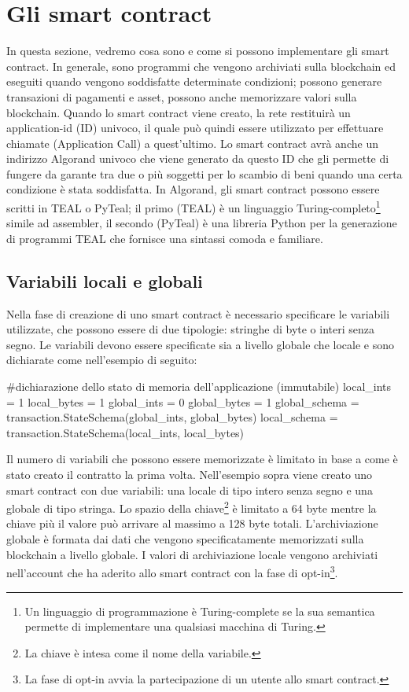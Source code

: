 \section{Gli smart contract}
In questa sezione, vedremo cosa sono e come si possono implementare gli smart contract. In generale, sono programmi che vengono archiviati sulla blockchain ed eseguiti quando vengono soddisfatte determinate condizioni; possono generare transazioni di pagamenti e asset, possono anche memorizzare valori sulla blockchain. Quando lo smart contract viene creato, la rete restituirà un application-id (ID) univoco, il quale può quindi essere utilizzato per effettuare chiamate (Application Call) a quest'ultimo. Lo smart contract avrà anche un indirizzo Algorand univoco che viene generato da questo ID che gli permette di fungere da garante tra due o più soggetti per lo scambio di beni quando una certa condizione è stata soddisfatta. In Algorand, gli smart contract possono essere scritti in TEAL o PyTeal; il primo (TEAL) è un linguaggio Turing-completo\footnote{Un linguaggio di programmazione è Turing-complete se la sua semantica permette di implementare una qualsiasi macchina di Turing.} simile ad assembler, il secondo (PyTeal) è una libreria Python per la generazione di programmi TEAL che fornisce una sintassi comoda e familiare.

\subsection{Variabili locali e globali}
Nella fase di creazione di uno smart contract è necessario specificare le variabili utilizzate, che possono essere di due tipologie: stringhe di byte o interi senza segno. Le variabili devono essere specificate sia a livello globale che locale e sono dichiarate come nell'esempio di seguito:

\begin{pythoncode}
#dichiarazione dello stato di memoria dell'applicazione (immutabile)
local_ints = 1
local_bytes = 1
global_ints = 0
global_bytes = 1
global_schema = transaction.StateSchema(global_ints, global_bytes)
local_schema = transaction.StateSchema(local_ints, local_bytes)
\end{pythoncode}

Il numero di variabili che possono essere memorizzate è limitato in base a come è stato creato il contratto la prima volta. Nell'esempio sopra viene creato uno smart contract con due variabili: una locale di tipo intero senza segno e una globale di tipo stringa. Lo spazio della chiave\footnote{La chiave è intesa come il nome della variabile.} è limitato a 64 byte mentre la chiave più il valore può arrivare al massimo a 128 byte totali. L’archiviazione globale è formata dai dati che vengono specificatamente memorizzati sulla blockchain a livello globale. I valori di archiviazione locale vengono archiviati nell'account che ha aderito allo smart contract con la fase di opt-in\footnote{La fase di opt-in avvia la partecipazione di un utente allo smart contract.}.

